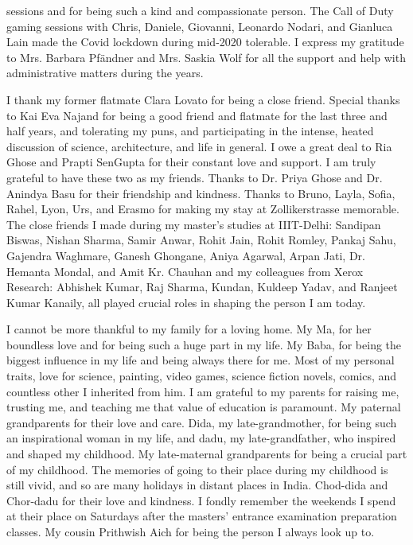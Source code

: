 sessions and for being such a kind and compassionate person. The Call of Duty gaming sessions with Chris, Daniele, Giovanni, Leonardo Nodari, and Gianluca Lain made the Covid lockdown during mid-2020 tolerable. I express my gratitude to Mrs. Barbara Pf\"andner and Mrs. Saskia Wolf for all the support and help with administrative matters during the years. 


I thank my former flatmate Clara Lovato for being a close friend. Special thanks to Kai Eva Najand for being a good friend and flatmate for the last three and half years, and tolerating my puns, and participating in the intense, heated discussion of science, architecture, and life in general. I owe a great deal to Ria Ghose and Prapti SenGupta for their constant love and support. I am truly grateful to have these two as my friends. Thanks to Dr. Priya Ghose and Dr. Anindya Basu for their friendship and kindness. Thanks to Bruno, Layla, Sofia, Rahel, Lyon, Urs, and Erasmo for making my stay at Zollikerstrasse memorable. The close friends I made during my master's studies at IIIT-Delhi: Sandipan Biswas, Nishan Sharma, Samir Anwar, Rohit Jain, Rohit Romley, Pankaj Sahu, Gajendra Waghmare, Ganesh Ghongane, Aniya Agarwal, Arpan Jati, Dr. Hemanta Mondal, and Amit Kr. Chauhan and my colleagues from Xerox Research: Abhishek Kumar, Raj Sharma, Kundan, Kuldeep Yadav, and Ranjeet Kumar Kanaily, all played crucial roles in shaping the person I am today.


I cannot be more thankful to my family for a loving home. My Ma, for her boundless love and for being such a huge part in my life. My Baba, for being the biggest influence in my life and being always there for me. Most of my personal traits, love for science, painting, video games, science fiction novels, comics, and countless other I inherited from him. I am grateful to my parents for raising me, trusting me, and teaching me that value of education is paramount. My paternal grandparents for their love and care. Dida, my late-grandmother, for being such an inspirational woman in my life, and dadu, my late-grandfather, who inspired and shaped my childhood. My late-maternal grandparents for being a crucial part of my childhood. The memories of going to their place during my childhood is still vivid, and so are many holidays in distant places in India. Chod-dida and Chor-dadu for their love and kindness. I fondly remember the weekends I spend at their place on Saturdays after the masters' entrance examination preparation classes. My cousin Prithwish Aich for being the person I always look up to.

